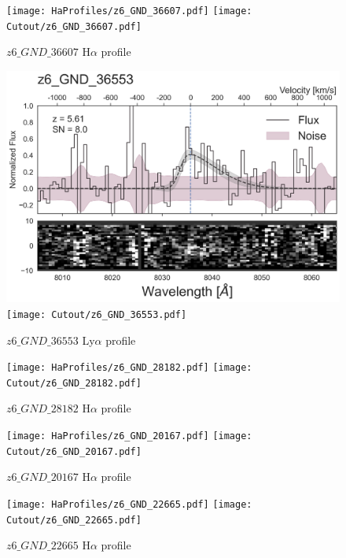 \documentclass[12pt,english]{article}
\begin{document}
\clearpage
\begin{figure}
\begin{center}\texttt{[image: HaProfiles/z6\_GND\_36607.pdf]}
\texttt{[image: Cutout/z6\_GND\_36607.pdf]}
\caption{$z6\_GND\_36607$ H$\alpha$ profile}
\end{center}
\end{figure}
\clearpage
\begin{figure}
\begin{center}\includegraphics[width=12cm, trim=0.1cm 0cm 0cm -1cm]{LyaProfiles/z6_GND_36553.png}
\texttt{[image: Cutout/z6\_GND\_36553.pdf]}
\caption{$z6\_GND\_36553$ Ly$\alpha$ profile}
\end{center}
\end{figure}
\clearpage
\begin{figure}
\begin{center}\texttt{[image: HaProfiles/z6\_GND\_28182.pdf]}
\texttt{[image: Cutout/z6\_GND\_28182.pdf]}
\caption{$z6\_GND\_28182$ H$\alpha$ profile}
\end{center}
\end{figure}
\clearpage
\begin{figure}
\begin{center}\texttt{[image: HaProfiles/z6\_GND\_20167.pdf]}
\texttt{[image: Cutout/z6\_GND\_20167.pdf]}
\caption{$z6\_GND\_20167$ H$\alpha$ profile}
\end{center}
\end{figure}
\clearpage
\begin{figure}
\begin{center}\texttt{[image: HaProfiles/z6\_GND\_22665.pdf]}
\texttt{[image: Cutout/z6\_GND\_22665.pdf]}
\caption{$z6\_GND\_22665$ H$\alpha$ profile}
\end{center}
\end{figure}
\end{document}

